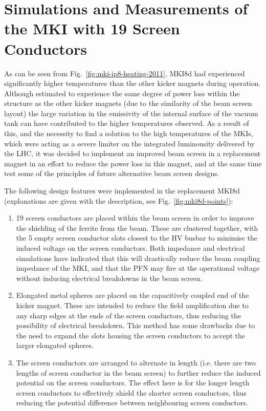 \section{Simulations and Measurements of the MKI with 19 Screen Conductors}

As can be seen from Fig.~\ref{fig:mki-ip8-heating-2011}, MKI8d had experienced significantly higher temperatures than the other kicker magnets during operation. Although estimated to experience the same degree of power loss within the structure as the other kicker magnets (due to the similarity of the beam screen layout) the large variation in the emissivity of the internal surface of the vacuum tank can have contributed to the higher temperatures observed. As a result of this, and the necessity to find a solution to the high temperatures of the MKIs, which were acting as a severe limiter on the integrated luminousity delivered by the LHC, it was decided to implement an improved beam screen in a replacement magnet in an effort to reduce the power loss in this magnet, and at the same time test some of the principles of future alternative beam screen designs.

The following design features were implemented in the replacement MKI8d (explanations are given with the description, see Fig.~\ref{fig:mki8d-points}):

\begin{enumerate}
\item{19 screen conductors are placed within the beam screen in order to improve the shielding of the ferrite from the beam. These are clustered together, with the 5 empty screen conductor slots closest to the HV busbar to minimise the induced voltage on the screen conductors. Both impedance and electrical simulations have indicated that this will drastically reduce the beam coupling impedance of the MKI, and that the PFN may fire at the operational voltage without inducing electrical breakdowns in the beam screen.}
\item{Elongated metal spheres are placed on the capacitively coupled end of the kicker magnet. These are intended to reduce the field amplification due to any sharp edges at the ends of the screen conductors, thus reducing the possibility of electrical breakdown. This method has some drawbacks due to the need to expand the slots housing the screen conductors to accept the larger elongated spheres.}
\item{The screen conductors are arranged to alternate in length (i.e. there are two lengths of screen conductor in the beam screen) to further reduce the induced potential on the screen conductors. The effect here is for the longer length screen conductors to effectively shield the shorter screen conductors, thus reducing the potential difference between neighbouring screen conductors.}
\end{enumerate}

